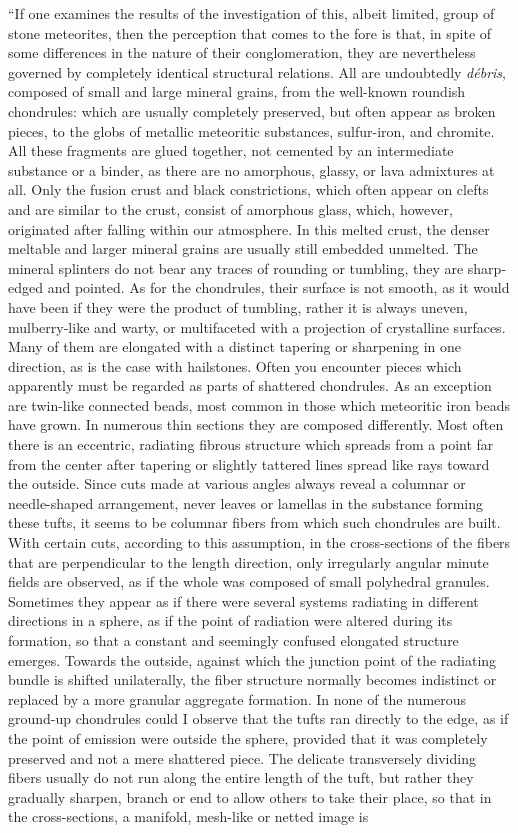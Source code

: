 \documentclass[a4paper, 12pt, oneside]{article}
\begin{document}
``If one examines the results of the investigation of this, albeit limited, group of stone meteorites, then the perception that comes to the fore is that, in spite of some differences in the nature of their conglomeration, they are nevertheless governed by completely identical structural relations. All are undoubtedly \emph{débris}, composed of small and large mineral grains, from the well-known roundish chondrules: which are usually completely preserved, but often appear as broken pieces, to the globs of metallic meteoritic substances, sulfur-iron, and chromite. All these fragments are glued together, not cemented by an intermediate substance or a binder, as there are no amorphous, glassy, or lava admixtures at all. Only the fusion crust and black constrictions, which often appear on clefts and are similar to the crust, consist of amorphous glass, which, however, originated after falling within our atmosphere. In this melted crust, the denser meltable and larger mineral grains are usually still embedded unmelted. The mineral splinters do not bear any traces of rounding or tumbling, they are sharp-edged and pointed. As for the chondrules, their surface is not smooth, as it would have been if they were the product of tumbling, rather it is always uneven, mulberry-like and warty, or multifaceted with a projection of crystalline surfaces. Many of them are elongated with a distinct tapering or sharpening in one direction, as is the case with hailstones. Often you encounter pieces which apparently must be regarded as parts of shattered chondrules. As an exception are twin-like connected beads, most common in those which meteoritic iron beads have grown. In numerous thin sections they are composed differently. Most often there is an eccentric, radiating fibrous structure which spreads from a point far from the center after tapering or slightly tattered lines spread like rays toward the outside. Since cuts made at various angles always reveal a columnar or needle-shaped arrangement, never leaves or lamellas in the substance forming these tufts, it seems to be columnar fibers from which such chondrules are built. With certain cuts, according to this assumption, in the cross-sections of the fibers that are perpendicular to the length direction, only irregularly angular minute fields are observed, as if the whole was composed of small polyhedral granules. Sometimes they appear as if there were several systems radiating in different directions in a sphere, as if the point of radiation were altered during its formation, so that a constant and seemingly confused elongated structure emerges. Towards the outside, against which the junction point of the radiating bundle is shifted unilaterally, the fiber structure normally becomes indistinct or replaced by a more granular aggregate formation. In none of the numerous ground-up chondrules could I observe that the tufts ran directly to the edge, as if the point of emission were outside the sphere, provided that it was completely preserved and not a mere shattered piece. The delicate transversely dividing fibers usually do not run along the entire length of the tuft, but rather they gradually sharpen, branch or end to allow others to take their place, so that in the cross-sections, a manifold, mesh-like or netted image is 
\end{document}

